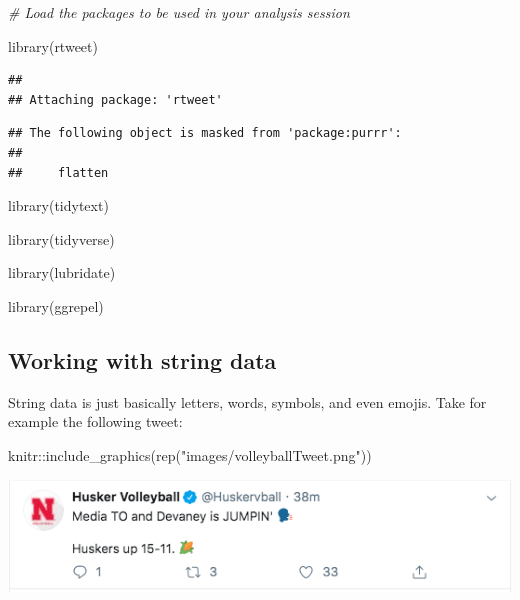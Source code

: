 \documentclass[
]{book}
\newenvironment{Shaded}{\begin{snugshade}}{\end{snugshade}}
\newcommand{\CommentTok}[1]{\textcolor[rgb]{0.56,0.35,0.01}{\textit{#1}}}
\newcommand{\FunctionTok}[1]{\textcolor[rgb]{0.00,0.00,0.00}{#1}}
\newcommand{\NormalTok}[1]{#1}
\newcommand{\SpecialCharTok}[1]{\textcolor[rgb]{0.00,0.00,0.00}{#1}}
\newcommand{\StringTok}[1]{\textcolor[rgb]{0.31,0.60,0.02}{#1}}
\begin{document}
\begin{Shaded}
\begin{Highlighting}[]
\CommentTok{\# Load the packages to be used in your analysis session}

\FunctionTok{library}\NormalTok{(rtweet)}
\end{Highlighting}
\end{Shaded}

\begin{verbatim}
## 
## Attaching package: 'rtweet'
\end{verbatim}

\begin{verbatim}
## The following object is masked from 'package:purrr':
## 
##     flatten
\end{verbatim}

\begin{Shaded}
\begin{Highlighting}[]
\FunctionTok{library}\NormalTok{(tidytext)}

\FunctionTok{library}\NormalTok{(tidyverse)}

\FunctionTok{library}\NormalTok{(lubridate)}

\FunctionTok{library}\NormalTok{(ggrepel)}
\end{Highlighting}
\end{Shaded}

\hypertarget{working-with-string-data}{%
\subsection{Working with string data}\label{working-with-string-data}}

String data is just basically letters, words, symbols, and even emojis. Take for example the following tweet:

\begin{Shaded}
\begin{Highlighting}[]
\NormalTok{knitr}\SpecialCharTok{::}\FunctionTok{include\_graphics}\NormalTok{(}\FunctionTok{rep}\NormalTok{(}\StringTok{"images/volleyballTweet.png"}\NormalTok{))}
\end{Highlighting}
\end{Shaded}

\includegraphics[width=7.53in]{images/volleyballTweet}
\end{document}
